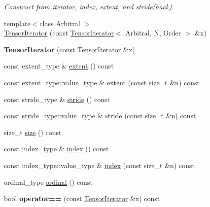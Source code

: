\begin{DoxyCompactItemize}
\begin{DoxyCompactList}\small\item\em Construct from iterator, index, extent, and stride(hack). \item\end{DoxyCompactList}\item 
{\footnotesize template$<$class Arbitral $>$ }\\\hyperlink{classbtas_1_1_tensor_iterator_a2f54bd12f948e0dc49825e2c4b451535}{TensorIterator} (const \hyperlink{classbtas_1_1_tensor_iterator}{TensorIterator}$<$ Arbitral, N, Order $>$ \&x)
\item 
\hypertarget{classbtas_1_1_tensor_iterator_ae27914c9aa975e81b47b36fe2dbb97e6}{
{\bfseries TensorIterator} (const \hyperlink{classbtas_1_1_tensor_iterator}{TensorIterator} \&x)}
\label{classbtas_1_1_tensor_iterator_ae27914c9aa975e81b47b36fe2dbb97e6}

\item 
const extent\_\-type \& \hyperlink{classbtas_1_1_tensor_iterator_a0a09a0bc84f22980d6cc945afeea9330}{extent} () const 
\item 
const extent\_\-type::value\_\-type \& \hyperlink{classbtas_1_1_tensor_iterator_a45594305ef32669f649eec878fd3d5fb}{extent} (const size\_\-t \&n) const 
\item 
const stride\_\-type \& \hyperlink{classbtas_1_1_tensor_iterator_a9bc81d9b128b82094c4bcad7a7a608a5}{stride} () const 
\item 
const stride\_\-type::value\_\-type \& \hyperlink{classbtas_1_1_tensor_iterator_ab9869c6e8504e968f4fd2e170f26bd25}{stride} (const size\_\-t \&n) const 
\item 
size\_\-t \hyperlink{classbtas_1_1_tensor_iterator_adddb70a169a79dbf3ca20b2aaa9d7bbc}{size} () const 
\item 
const index\_\-type \& \hyperlink{classbtas_1_1_tensor_iterator_a7afd5a83f9efe78e6e85b8c4aadd4494}{index} () const 
\item 
const index\_\-type::value\_\-type \& \hyperlink{classbtas_1_1_tensor_iterator_a095c6060b59b45cb7ff6f85fd240948b}{index} (const size\_\-t \&n) const 
\item 
ordinal\_\-type \hyperlink{classbtas_1_1_tensor_iterator_a65615e9a1eb4fa5178fdbe8fa49da303}{ordinal} () const 
\item 
\hypertarget{classbtas_1_1_tensor_iterator_a7252d68a7ca47367d13b49bafa139f7f}{
bool {\bfseries operator==} (const \hyperlink{classbtas_1_1_tensor_iterator}{TensorIterator} \&x) const }
\label{classbtas_1_1_tensor_iterator_a7252d68a7ca47367d13b49bafa139f7f}


\end{DoxyCompactItemize}
